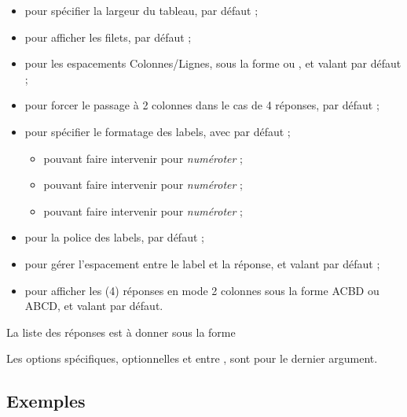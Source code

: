 \documentclass[french,11pt,a4paper]{article}
\begin{document}
\begin{itemize}
	\item {} pour spécifier la largeur du tableau,  par défaut ;
	\item {} pour afficher les filets,  par défaut ;
	\item {} pour les espacements Colonnes/Lignes, sous la forme  ou , et valant \MontreCode{6pt/2pt} par défaut ;
	\item {} pour forcer le passage à 2 colonnes dans le cas de 4 réponses,  par défaut ;
	\item {} pour spécifier le formatage des labels, avec  par défaut ;
	\begin{itemize}
		\item pouvant faire intervenir  pour \textit{numéroter}  ;
		\item pouvant faire intervenir  pour \textit{numéroter}  ;
		\item pouvant faire intervenir  pour \textit{numéroter}  ;
	\end{itemize}
	\item {} pour la police des labels,  par défaut ;
	\item {} pour gérer l'espacement entre le label et la réponse, et valant  par défaut ;
	\item {} pour afficher les (4) réponses en mode 2 colonnes sous la forme ACBD ou ABCD, et valant  par défaut.
\end{itemize}

La liste des réponses est à donner sous la forme 

Les options spécifiques, optionnelles et entre , sont pour le dernier argument.

\subsection{Exemples}

\begin{DemoCode}{}
\end{DemoCode}
\end{document}
